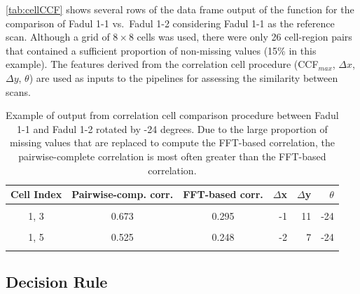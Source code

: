 \autoref{tab:cellCCF} shows several rows of the data frame output of the
 function for the comparison of Fadul 1-1
vs.~Fadul 1-2 considering Fadul 1-1 as the reference scan. Although a
grid of \(8 \times 8\) cells was used, there were only 26 cell-region
pairs that contained a sufficient proportion of non-missing values (15\%
in this example). The features derived from the correlation cell
procedure (CCF\(_{max}\), \(\Delta x\), \(\Delta y\), \(\theta\)) are
used as inputs to the pipelines for assessing the similarity between
scans.

\begin{Schunk}
\begin{table}

\caption{\label{tab:unnamed-chunk-13}\label{tab:cellCCF} Example of output from correlation cell comparison procedure between Fadul 1-1 and Fadul 1-2 rotated by -24 degrees. Due to the large proportion of missing values that are replaced to compute the FFT-based correlation, the pairwise-complete correlation is most often greater than the FFT-based correlation.}
\centering
\begin{tabular}[t]{|cccrrr|}
\toprule
Cell Index & Pairwise-comp. corr. & FFT-based corr. & $\Delta$x & $\Delta$y & $\theta$\\
\midrule
\cellcolor{lightgray}{1, 2} & \cellcolor{lightgray}{0.630} & \cellcolor{lightgray}{0.214} & \cellcolor{lightgray}{31} & \cellcolor{lightgray}{22} & \cellcolor{lightgray}{-24}\\
1, 3 & 0.673 & 0.295 & -1 & 11 & -24\\
\cellcolor{lightgray}{1, 4} & \cellcolor{lightgray}{0.634} & \cellcolor{lightgray}{0.255} & \cellcolor{lightgray}{-2} & \cellcolor{lightgray}{7} & \cellcolor{lightgray}{-24}\\
1, 5 & 0.525 & 0.248 & -2 & 7 & -24\\
\cellcolor{lightgray}{1, 6} & \cellcolor{lightgray}{0.658} & \cellcolor{lightgray}{0.294} & \cellcolor{lightgray}{-1} & \cellcolor{lightgray}{7} & \cellcolor{lightgray}{-24}\\
\bottomrule
\end{tabular}
\end{table}

\end{Schunk}

\hypertarget{decision-rule}{%
\subsection{Decision Rule}\label{decision-rule}}

